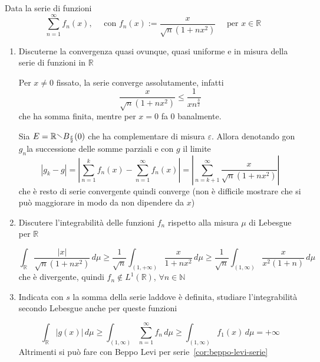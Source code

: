 \begin{eser}[Es. 1 del 10 \-- 07 \-- 2018]
    Data la serie di funzioni
    \[
      \sum_{n=1}^{\infty} f_{n}{(x)}, \quad \text{ con } f_{n}{(x)} :=
      \frac{x}{\sqrt{n}{(1+nx^2)}} \quad \text{ per } x \in \mathbb{R}
    \]
\begin{enumerate}[label = \alph*.]
    \item Discuterne la convergenza quasi ovunque, quasi uniforme e in misura
        della serie di funzioni in \(\mathbb{R}\) 

    Per \(x\neq 0\) fissato, la serie converge assolutamente, infatti
    \[
      \frac{x}{\sqrt{n}{(1 + nx^2)}} \le \frac{1}{xn^{\frac{3}{2}}} 
    \]
    che ha somma finita, mentre per \(x=0\) fa 0 banalmente.

    Sia \(E = \mathbb{R} \sminus B_{\frac{\varepsilon}{2}} {(0)}\) che ha
    complementare di misura \(\varepsilon\). Allora denotando gon \(g_{n}\)la
    successione delle somme parziali e con \(g\) il limite 
    \[
        \left| g_{k} - g \right| = \left| \sum_{n=1}^{k} f_{n}{(x)} -
        \sum_{n=1}^{\infty} f_{n}{(x)}   \right| = \left| \sum_{n=k+1}^{\infty}
        \frac{x}{\sqrt{n}{(1+nx^2)}}\right| 
    \]
    che è resto di serie convergente quindi converge (non è difficile mostrare
    che si può maggiorare in modo da non dipendere da \(x\))
    \item Discutere l'integrabilità delle funzioni \(f_{n}\) rispetto alla
        misura \(\mu\) di Lebesgue per \(\mathbb{R}\) 

    \[
      \int _{\mathbb{R}} \frac{|x|}{\sqrt{n}{(1+nx^2)}} \,d \mu \ge
      \frac{1}{\sqrt{n}} \int _{(1, +\infty)} \frac{x}{1+nx^2}  \,d \mu \ge
      \frac{1}{\sqrt{n}} \int _{{(1, \infty)}} \frac{x}{x^2{(1+n)}} \,d \mu
    \]
    che è divergente, quindi \(f_{n}\not\in L^{1}{(\mathbb{R})}\), \(\forall n
    \in \mathbb{N}\) 
    \item Indicata con \(s\) la somma della serie laddove è definita, studiare
        l'integrabilità secondo Lebesgue anche per queste funzioni

    \[
        \int _{\mathbb{R}} |g{(x)}| \,d \mu \ge \int _{{(1, \infty)}}
        \sum_{n=1}^{\infty} f_{n} \,d \mu \ge \int _{{(1, \infty)}} f_{1}{(x)}
        \,d \mu = +\infty
    \]
    Altrimenti si può fare con Beppo Levi per serie~\ref{cor:beppo-levi-serie}
\end{enumerate}
\end{eser}



